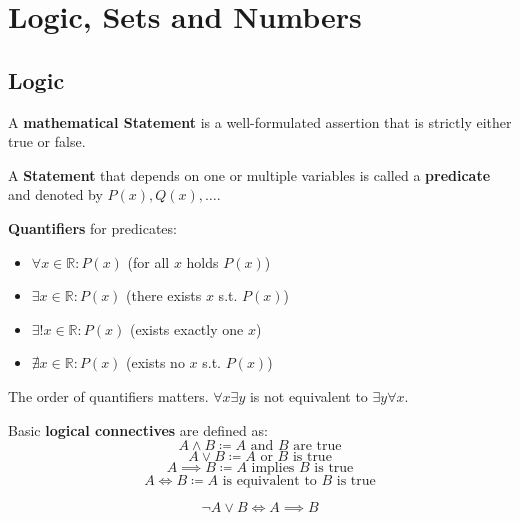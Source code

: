 \section{Logic, Sets and Numbers}

\subsection{Logic}

\begin{definition}
    A \textbf{mathematical Statement} is a well-formulated assertion that is strictly either true or false.
\end{definition}

\begin{definition}
    A \textbf{Statement} that depends on one or multiple variables is called a \textbf{predicate} and denoted by $P(x), Q(x), \dots$.
\end{definition}

\begin{definition}
    \textbf{Quantifiers} for predicates:
    \begin{itemize}
        \item $\forall x \in \mathbb{R}: P(x)$ (for all $x$ holds $P(x)$)
        \item $\exists x \in \mathbb{R}: P(x)$ (there exists $x$ s.t. $P(x)$)
        \item $\exists ! x \in \mathbb{R}: P(x)$ (exists exactly one $x$)
        \item $\nexists x \in \mathbb{R}: P(x)$ (exists no $x$ s.t. $P(x)$)
    \end{itemize}
\end{definition}

\begin{important}
    The order of quantifiers matters. $\forall x \exists y$ is not equivalent to $\exists y \forall x$.
\end{important}

\begin{definition}
    Basic \textbf{logical connectives} are defined as:
    $$A \land B \coloneqq A \text{ and } B \text{ are true}$$
    $$A \lor B \coloneqq A \text{ or } B \text{ is true}$$
    $$A \implies B \coloneqq A \text{ implies } B \text{ is true}$$
    $$A \iff B \coloneqq A \text{ is equivalent to } B \text{ is true}$$
\end{definition}

\begin{lemma}
    $$\neg A \lor B \iff A \implies B$$
\end{lemma}

